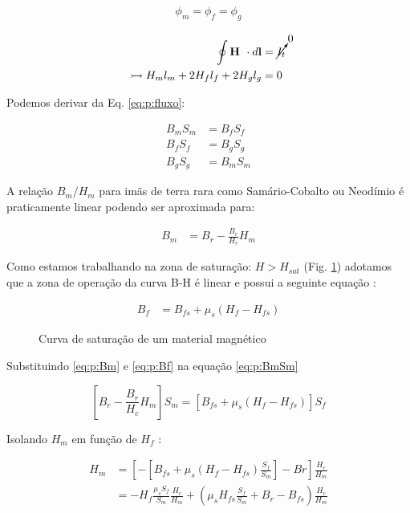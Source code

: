 \begin{eqnarray}
	\phi_m = \phi_f = \phi_g \label{eq:p:fluxo}
\end{eqnarray}

\begin{align}
	\oint{ \textbf{H } \cdot d\textbf{l}} &= \cancelto{0}{I_t} \notag\\ 
	\rightarrowtail	H_m l_m + 2 H_f l_f + 2 H_g l_g &= 0 \label{eq:p:linhas}
\end{align}

Podemos derivar da Eq. \ref{eq:p:fluxo}:

\begin{align}
	B_m S_m &= B_f S_f \label{eq:p:BmSm} \\ 
	B_f S_f &= B_g S_g \label{eq:p:BfSf} \\ 
	B_g S_g &= B_m S_m \label{eq:p:BgSg}
\end{align}

A relação $B_m/H_m$ para imãs de terra rara como Samário-Cobalto ou Neodímio é praticamente linear podendo ser aproximada para:


\begin{align}
	B_m &= B_r - \frac{B_r}{H_c}H_m \label{eq:p:Bm}
\end{align}


Como estamos trabalhando na zona de saturação: $H > H_{sat}$ (Fig. \ref{Fig:Modelagem:Curva:BH}) adotamos que a zona de operação da curva B-H é linear e possui a seguinte equação :

\begin{align}
	B_f &= B_{fs} + \mu_s (H_f - H_{fs}) \label{eq:p:Bf}
\end{align}

\begin{figure}[!ht]
	\centering
	\def\svgwidth{0.7\columnwidth}
	
		\caption{Curva de saturação de um material magnético}
		\label{Fig:Modelagem:Curva:BH}
\end{figure}

Substituindo \eqref{eq:p:Bm} e \eqref{eq:p:Bf} na equação \eqref{eq:p:BmSm}


\[	[B_r - \frac{B_r}{H_c}H_m]S_m = \left[ B_{fs} + \mu_s (H_f - H_{fs}) \right] S_f \]

Isolando $H_m$ em função de $H_f$ :

\begin{align}
	H_m &= \left[ -\left[B_{fs} + \mu_s (H_f - H_{fs}) \frac{S_f}{S_m}\right] - Br \right] \frac{H_c}{H_m} \\
	&=  - H_f \frac{\mu_s S_f}{S_m}\frac{H_c}{H_m} + \left( \mu_s H_{fs} \frac{S_f}{S_m} + B_r - B_{fs}\right) \frac{H_c}{H_m}
	\label{eq:p:Hm}
\end{align}

